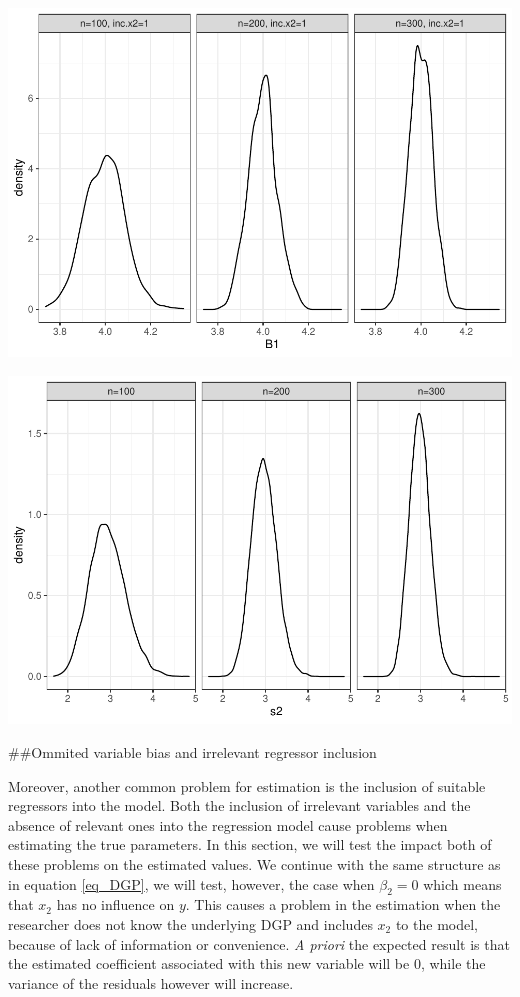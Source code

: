 \documentclass[10pt,a4paper]{article}
\let\origfigure\figure
\let\endorigfigure\endfigure
\renewenvironment{figure}[1][2] {
	\expandafter\origfigure\expandafter[H]
} {
	\endorigfigure
}
\begin{document}
 \begin{figure}
 \centering
 \includegraphics{Report_files/figure-latex/ols_b1-1.pdf}
 \caption{MC \(\beta_1\) results}
 \end{figure}

 \begin{figure}
 \centering
 \includegraphics{Report_files/figure-latex/ols_s2-1.pdf}
 \caption{MC \(s^2\) results}
 \end{figure}

 \#\#Ommited variable bias and irrelevant regressor inclusion

 Moreover, another common problem for estimation is the inclusion of
 suitable regressors into the model. Both the inclusion of irrelevant
 variables and the absence of relevant ones into the regression model
 cause problems when estimating the true parameters. In this section, we
 will test the impact both of these problems on the estimated values.
 \noindent We continue with the same structure as in equation
 \eqref{eq_DGP}, we will test, however, the case when \(\beta_2 = 0\)
 which means that \(x_2\) has no influence on \(y\). This causes a
 problem in the estimation when the researcher does not know the
 underlying DGP and includes \(x_2\) to the model, because of lack of
 information or convenience. \textit{A priori} the expected result is
 that the estimated coefficient associated with this new variable will
 be 0, while the variance of the residuals however will increase.
\end{document}
